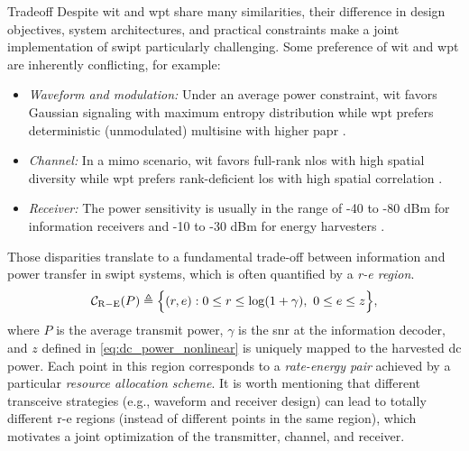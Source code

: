 \begin{section}{}
	\begin{subsection}{ Tradeoff}
		Despite \gls{wit} and \gls{wpt} share many similarities, their difference in design objectives, system architectures, and practical constraints make a joint implementation of \gls{swipt} particularly challenging.
		Some preference of \gls{wit} and \gls{wpt} are inherently conflicting, for example:
		\begin{itemize}
			\item \emph{Waveform and modulation:} Under an average power constraint, \gls{wit} favors Gaussian signaling with maximum entropy distribution \cite{Cover2005} while \gls{wpt} prefers deterministic (unmodulated) multisine with higher \gls{papr} \cite{Trotter2009}.
			\item \emph{Channel:} In a \gls{mimo} scenario, \gls{wit} favors full-rank \gls{nlos} with high spatial diversity while \gls{wpt} prefers rank-deficient \gls{los} with high spatial correlation \cite{Wu2022a}.
			\item \emph{Receiver:} The power sensitivity is usually in the range of -40 to -80 dBm for information receivers and -10 to -30 dBm for energy harvesters \cite{Lu2015}.
		\end{itemize}
		Those disparities translate to a fundamental trade-off between information and power transfer in \gls{swipt} systems, which is often quantified by a \emph{\gls{r-e} region}.
		\begin{equation}
			\mathcal{C}_\mathrm{R-E}(P) \triangleq \Bigl\{ (r,e) : 0 \le r \le \log(1 + \gamma), \ 0 \le e \le z \Bigr\},
		\end{equation}
		where $P$ is the average transmit power, $\gamma$ is the \gls{snr} at the information decoder, and $z$ defined in \eqref{eq:dc_power_nonlinear} is uniquely mapped to the harvested \gls{dc} power.
		Each point in this region corresponds to a \emph{rate-energy pair} achieved by a particular \emph{resource allocation scheme}.
		It is worth mentioning that different transceive strategies (e.g., waveform and receiver design) can lead to totally different \gls{r-e} regions (instead of different points in the same region), which motivates a joint optimization of the transmitter, channel, and receiver.
	\end{subsection}


\end{section}
